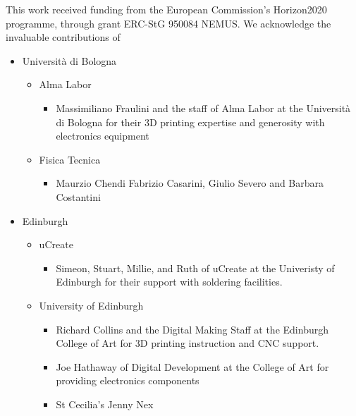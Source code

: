 \documentclass[sigconf]{nimeart}
\begin{document}
\maketitle



\begin{acks}
This work received funding from the European Commission's Horizon2020 programme, through grant ERC-StG 950084 NEMUS. We acknowledge the invaluable contributions of
\begin{itemize}
\item
  Università di Bologna
  \begin{itemize}
  \item
    Alma Labor
    \begin{itemize}
    \item
      Massimiliano Fraulini and the staff of Alma Labor at the Università
      di Bologna for their 3D printing expertise and generosity with
      electronics equipment
    \end{itemize}
  \item
    Fisica Tecnica
    \begin{itemize}
    \item
      Maurzio Chendi Fabrizio Casarini, Giulio Severo and Barbara
      Costantini
    \end{itemize}
  \end{itemize}
\item
  Edinburgh
  \begin{itemize}
  \item
    uCreate
    \begin{itemize}    
    \item
      Simeon, Stuart, Millie, and Ruth of uCreate at the Univeristy of
      Edinburgh for their support with soldering facilities.
    \end{itemize}
  \item
    University of Edinburgh
    \begin{itemize}
    \item
      Richard Collins and the Digital Making Staff at the Edinburgh
      College of Art for 3D printing instruction and CNC support.
    \item
      Joe Hathaway of Digital Development at the College of Art for
      providing electronics components
    \item
      St Cecilia's Jenny Nex
    \end{itemize}
  \end{itemize}
\end{itemize}

\end{acks}



\end{document}
